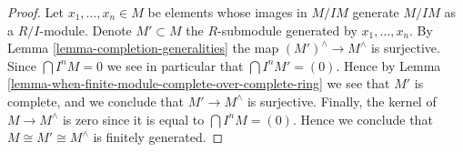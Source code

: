 \begin{proof}
Let $x_1, \ldots, x_n \in M$ be elements whose images in $M/IM$ generate
$M/IM$ as a $R/I$-module. Denote $M' \subset M$ the $R$-submodule
generated by $x_1, \ldots, x_n$. By Lemma \ref{lemma-completion-generalities}
the map $(M')^\wedge \to M^\wedge$ is surjective.
Since $\bigcap I^nM = 0$ we see in particular that $\bigcap I^nM' = (0)$.
Hence by Lemma \ref{lemma-when-finite-module-complete-over-complete-ring}
we see that $M'$ is complete, and we conclude that $M' \to M^\wedge$
is surjective. Finally, the kernel of $M \to M^\wedge$ is
zero since it is equal to $\bigcap I^nM = (0)$.
Hence we conclude that $M \cong M' \cong M^\wedge$
is finitely generated.
\end{proof}









